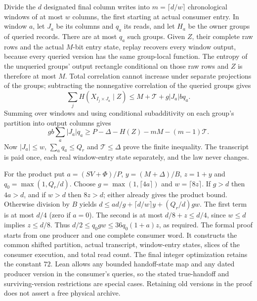 \begin{outline}
Divide the $d$ designated final column writes into
$m=\lceil d/w\rceil$ chronological windows of at most $w$ columns, the
first starting at actual consumer entry. In window $a$, let $J_a$ be its
columns and $q_a$ its reads, and let $H_a$ be the owner groups of queried
records. There are at most $q_a$ such groups. Given $Z$, their complete
raw rows and the actual $M$-bit entry state, replay recovers every window
output, because every queried version has the same group-local function.
The entropy of the unqueried groups' output rectangle conditional on those
raw rows and $Z$ is therefore at most $M$. Total correlation cannot increase
under separate projections of the groups; subtracting the nonnegative
correlation of the queried groups gives
\[
 \sum_jH(X_{I_j\times J_a}\mid Z)
       \le M+\mathcal T+g|J_a|bq_a.
\]
Summing over windows and using conditional subadditivity on each group's
partition into output columns gives
\[
 gb\sum_a|J_a|q_a
 \ge P-\Delta-H(Z)-mM-(m-1)\mathcal T.
\]
Now $|J_a|\le w$, $\sum_aq_a\le Q_r$ and $\mathcal T\le\Delta$
prove the finite inequality. The transcript is paid once, each real
window-entry state separately, and the law never changes.

For the product put $a=(SV+\Phi)/P$, $y=(M+\Delta)/B$, $z=1+y$ and
$q_0=\max(1,Q_r/d)$. Choose $g=\max(1,\lceil4a\rceil)$ and
$w=\lceil8z\rceil$. If $g>d$ then $4a>d$, and if $w>d$ then
$8z>d$; either already gives the product bound. Otherwise division by
$B$ yields $d\le ad/g+\lceil d/w\rceil y+(Q_r/d)gw$.
The first term is at most $d/4$ (zero if $a=0$). The second is at most
$d/8+z\le d/4$, since $w\le d$ implies $z\le d/8$.
Thus $d/2\le q_0gw\le36q_0(1+a)z$, as required.
The formal proof starts from one producer and one complete consumer word.
It constructs the common shifted partition, actual transcript, window-entry
states, slices of the consumer execution, and total read count. The final
integer optimization retains the constant $72$. Lean allows any bounded
handoff-state map and any dated producer version in the consumer's queries,
so the stated true-handoff and surviving-version restrictions are special
cases. Retaining old versions in the proof does not assert a free physical
archive.
\end{outline}

